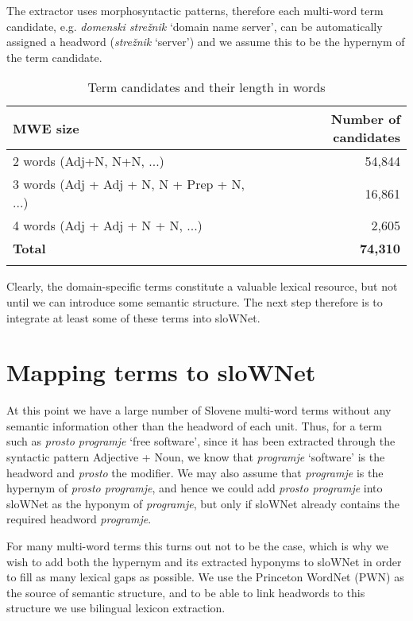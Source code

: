\documentclass[output=paper]{LSP/langsci}
\begin{document}
The extractor uses morphosyntactic patterns, therefore each multi-word term candidate, e.g. \textit{domenski strežnik} `domain name server', can be automatically assigned a headword (\textit{strežnik} `server') and we assume this to be the hypernym of the term candidate. 

\begin{table}
\begin{tabular}{lr}
\lsptoprule
{\bfseries MWE size } & \bfseries Number of candidates \\
\midrule
2 words (Adj+N, N+N, ...) & 54,844 \\
3 words (Adj + Adj + N, N + Prep + N, ...) &  16,861 \\
4 words (Adj + Adj + N + N, ...) & 2,605 \\
\bfseries Total & \bfseries 74,310 \\
\lspbottomrule
\end{tabular}
\caption{Term candidates and their length in words}
\label{tab:vintar:3}
\end{table}

Clearly, the domain-specific terms constitute a valuable lexical resource, but not until we can introduce some semantic structure. The next step therefore is to integrate at least some of these terms into sloWNet.

\section{Mapping terms to sloWNet}\label{sec:vintar:4}

At this point we have a large number of Slovene multi-word terms without any semantic information other than the headword of each unit. Thus, for a term such as \textit{prosto programje} `free software', since it has been extracted through the syntactic pattern Adjective + Noun, we know that \textit{programje} `software' is the headword and \textit{prosto} the modifier. We may also assume that \textit{programje} is the hypernym of \textit{prosto programje}, and hence we could add \textit{prosto programje} into sloWNet as the hyponym of \textit{programje}, but only if sloWNet already contains the required headword \textit{programje}. 

For many multi-word terms this turns out not to be the case, which is why we wish to add both the hypernym and its extracted hyponyms to sloWNet in order to fill as many lexical gaps as possible. We use the Princeton WordNet (PWN) as the source of semantic structure, and to be able to link headwords to this structure we use bilingual lexicon extraction. 
\end{document}
